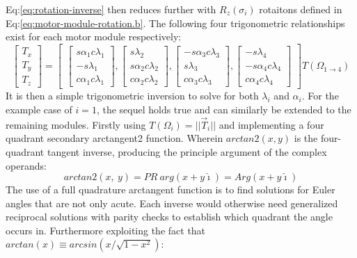 Eq:\ref{eq:rotation-inverse} then reduces further with $R_z(\sigma_i)$ rotaitons defined in Eq:\ref{eq:motor-module-rotation.b}. The following four trigonometric relationships exist for each motor module respectively:
\begin{equation}
\begin{bmatrix}
T_x\\
T_y\\
T_z
\end{bmatrix}
=
\begin{bmatrix}
\begin{bmatrix}
s\alpha_1 c\lambda_1\\
-s\lambda_1 \\
c\alpha_1 c\lambda_1
\end{bmatrix}
,
\begin{bmatrix}
s\lambda_2\\
s\alpha_2 c\lambda_2\\
c\alpha_2 c\lambda_2
\end{bmatrix}
,
\begin{bmatrix}
-s\alpha_3 c\lambda_3\\
s\lambda_3\\
c\alpha_3 c\lambda_3
\end{bmatrix}
,
\begin{bmatrix}
-s\lambda_4\\
-s\alpha_4 c\lambda_4\\
c\alpha_4 c\lambda_4
\end{bmatrix}
\end{bmatrix}T(\Omega_{1\rightarrow 4})
\end{equation}
It is then a simple trigonometric inversion to solve for both $\lambda_i$ and $\alpha_i$. For the example case of $i=1$, the sequel holds true and can similarly be extended to the remaining modules. Firstly using $T(\Omega_i)=||\vec{T}_i||$ and implementing a four quadrant secondary arctangent2 function. Wherein $arctan2(x,y)$ is the four-quadrant tangent inverse\cite{atan2}, producing the principle argument of the complex operands:
\begin{equation}
arctan2(x,~y)=PR~arg(x+y\hat{\imath})=Arg(x+y\hat{\imath})
\end{equation}
The use of a full quadrature arctangent function is to find solutions for Euler angles that are not only acute. Each inverse would otherwise need generalized reciprocal solutions with parity checks to establish which quadrant the angle occurs in. Furthermore exploiting the fact that $arctan(x)\equiv arcsin(x/\sqrt{1-x^2})$:
